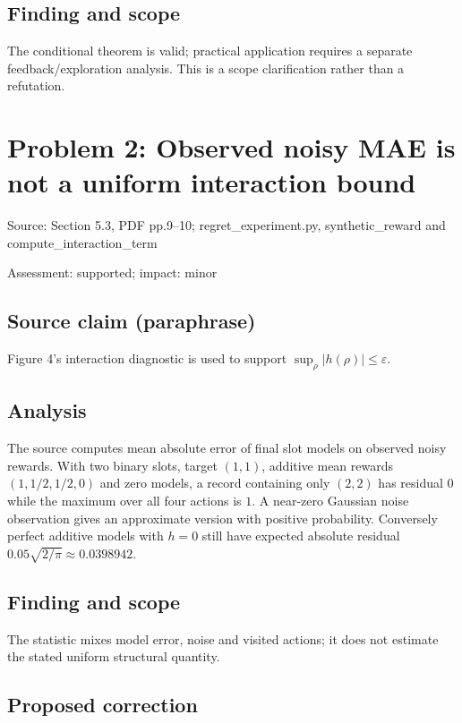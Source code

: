 \documentclass[11pt]{article}
\begin{document}
\subsection*{Finding and scope}

The conditional theorem is valid; practical application requires a separate feedback/exploration analysis. This is a scope clarification rather than a refutation.

\section*{Problem 2: Observed noisy MAE is not a uniform interaction bound}

Source: Section 5.3, PDF pp.9–10; regret\_experiment.py, synthetic\_reward and compute\_interaction\_term

Assessment: supported; impact: minor

\subsection*{Source claim (paraphrase)}

Figure 4’s interaction diagnostic is used to support \(\sup_\rho|h(\rho)|\le\varepsilon\).

\subsection*{Analysis}

The source computes mean absolute error of final slot models on observed noisy rewards. With two binary slots, target \((1,1)\), additive mean rewards \((1,1/2,1/2,0)\) and zero models, a record containing only \((2,2)\) has residual \(0\) while the maximum over all four actions is \(1\). A near-zero Gaussian noise observation gives an approximate version with positive probability. Conversely perfect additive models with \(h=0\) still have expected absolute residual \(0.05\sqrt{2/\pi}\approx0.0398942\).

\subsection*{Finding and scope}

The statistic mixes model error, noise and visited actions; it does not estimate the stated uniform structural quantity.

\subsection*{Proposed correction}
\end{document}
